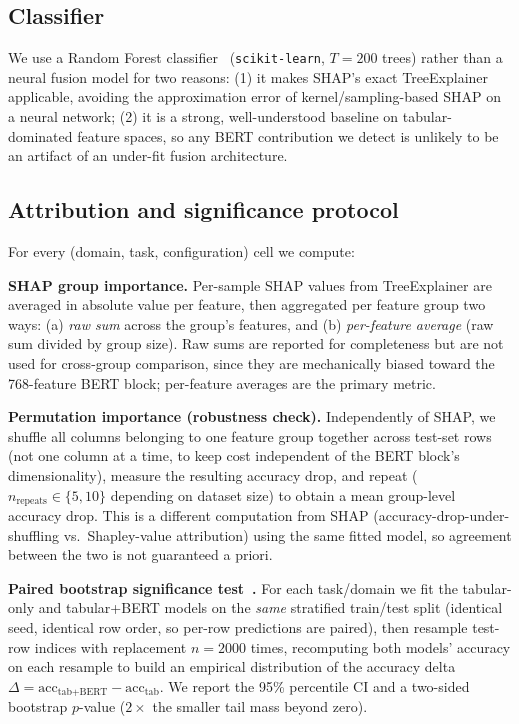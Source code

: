 \documentclass[conference]{IEEEtran}
\begin{document}
\subsection{Classifier}
We use a Random Forest classifier~\cite{breiman2001random} (\texttt{scikit-learn}, $T{=}200$ trees) rather than a neural fusion model for two reasons: (1) it makes SHAP's exact TreeExplainer applicable, avoiding the approximation error of kernel/sampling-based SHAP on a neural network; (2) it is a strong, well-understood baseline on tabular-dominated feature spaces, so any BERT contribution we detect is unlikely to be an artifact of an under-fit fusion architecture.

\subsection{Attribution and significance protocol}
\label{sec:protocol}
For every (domain, task, configuration) cell we compute:

\textbf{SHAP group importance.} Per-sample SHAP values from TreeExplainer are averaged in absolute value per feature, then aggregated per feature group two ways: (a) \emph{raw sum} across the group's features, and (b) \emph{per-feature average} (raw sum divided by group size). Raw sums are reported for completeness but are not used for cross-group comparison, since they are mechanically biased toward the 768-feature BERT block; per-feature averages are the primary metric.

\textbf{Permutation importance (robustness check).} Independently of SHAP, we shuffle all columns belonging to one feature group together across test-set rows (not one column at a time, to keep cost independent of the BERT block's dimensionality), measure the resulting accuracy drop, and repeat ($n_{\text{repeats}}\in\{5,10\}$ depending on dataset size) to obtain a mean group-level accuracy drop. This is a different computation from SHAP (accuracy-drop-under-shuffling vs.\ Shapley-value attribution) using the same fitted model, so agreement between the two is not guaranteed a priori.

\textbf{Paired bootstrap significance test~\cite{efron1994bootstrap}.} For each task/domain we fit the tabular-only and tabular+BERT models on the \emph{same} stratified train/test split (identical seed, identical row order, so per-row predictions are paired), then resample test-row indices with replacement $n{=}2000$ times, recomputing both models' accuracy on each resample to build an empirical distribution of the accuracy delta $\Delta = \text{acc}_{\text{tab+BERT}} - \text{acc}_{\text{tab}}$. We report the 95\% percentile CI and a two-sided bootstrap $p$-value ($2\times$ the smaller tail mass beyond zero).
\end{document}
